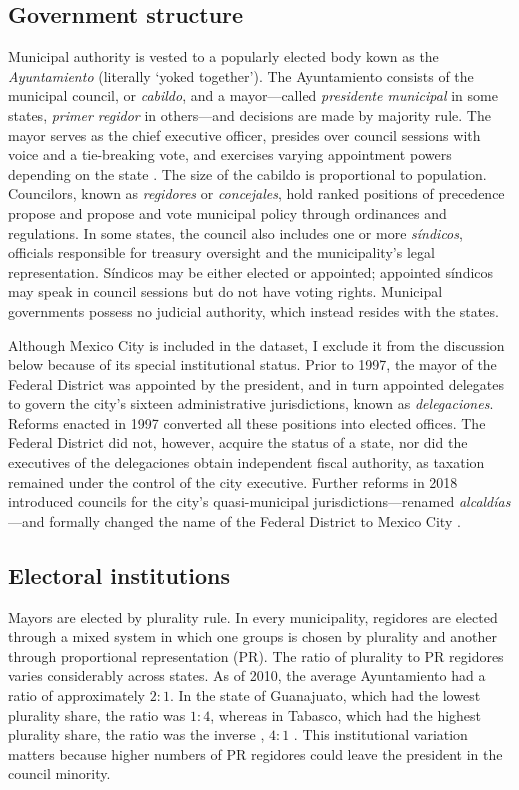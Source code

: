 \documentclass[letter,12pt]{article}
\begin{document}
\subsection{Government structure}\label{S:structure}
Municipal authority is vested to a popularly elected body kown as the \emph{Ayuntamiento} (literally `yoked together'). The Ayuntamiento consists of the municipal council, or \emph{cabildo}, and a mayor---called \emph{presidente municipal} in some states, \emph{primer regidor} in others---and decisions are made by majority rule. The mayor serves as the chief executive officer, presides over council sessions with voice and a tie-breaking vote, and exercises varying appointment powers depending on the state \citep{robles-mtz.Municipio.2009, rmz-millan.2000}. The size of the cabildo is proportional to population. Councilors, known as \emph{regidores} or \emph{concejales}, hold ranked positions of precedence propose and propose and vote municipal policy through ordinances and regulations. In some states, the council also includes one or more \emph{síndicos}, officials responsible for treasury oversight and the municipality's legal representation. Síndicos may be either elected or appointed; appointed síndicos may speak in council sessions but do not have voting rights. Municipal governments possess no judicial authority, which instead resides with the states.

Although Mexico City is included in the dataset, I exclude it from the discussion below because of its special institutional status. Prior to 1997, the mayor of the Federal District was appointed by the president, and in turn appointed delegates to govern the city’s sixteen administrative jurisdictions, known as \emph{delegaciones}. Reforms enacted in 1997 converted all these positions into elected offices. The Federal District did not, however, acquire the status of a state, nor did the executives of the delegaciones obtain independent fiscal authority,  as taxation remained under the control of the city executive. Further reforms in 2018 introduced councils for the city's quasi-municipal jurisdictions---renamed \emph{alcaldías}---and formally changed the name of the Federal District to Mexico City \citep{rabell.2017}. 

\subsection{Electoral institutions}
Mayors are elected by plurality rule. In every municipality, regidores are elected through a mixed system in which one groups is chosen by plurality and another through proportional representation (PR). The ratio of plurality to PR regidores varies considerably across states. As of 2010, the average Ayuntamiento had a ratio of approximately $2:1$. In the state of Guanajuato, which had the lowest plurality share, the ratio was $1:4$, whereas in Tabasco, which had the highest plurality share, the ratio was the inverse , $4:1$ \citep[][:14]{gil.2010}. This institutional variation matters because higher numbers of PR regidores could leave the president in the council minority.
\end{document}
